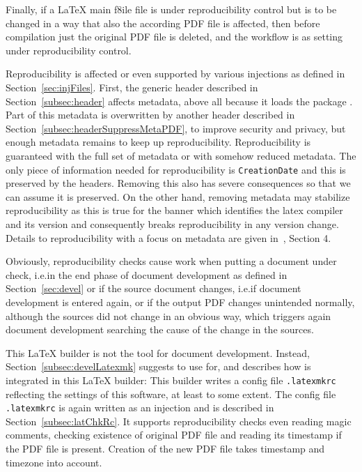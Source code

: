 Finally, if a \LaTeX{} main f8ile file is under reproducibility control 
but is to be changed in a way that also the according PDF file is affected, 
then before compilation just the original PDF file is deleted, 
and the workflow is as setting under reproducibility control. 
\medskip


Reproducibility is affected or even supported by various injections 
as defined in Section~\ref{sec:injFiles}. 
First, the generic header described in Section~\ref{subsec:header} 
affects metadata, above all because it loads the package . 
Part of this metadata is overwritten by another header 
described in Section~\ref{subsec:headerSuppressMetaPDF}, 
to improve security and privacy, 
but enough metadata remains to keep up reproducibility. 
Reproducibility is guaranteed with the full set of metadata 
or with somehow reduced metadata. 
The only piece of information needed for reproducibility is \texttt{CreationDate} 
and this is preserved by the headers. 
Removing this also has severe consequences 
so that we can assume it is preserved. 
On the other hand, removing metadata may stabilize reproducibility 
as this is true for the banner which identifies the latex compiler and its version 
and consequently breaks reproducibility in any version change. 
Details to reproducibility with a focus on metadata are given in~\cite{LatexGen}, Section 4. 

Obviously, reproducibility checks cause work 
when putting a document under check, 
i.e.\@ in the end phase of document development 
as defined in Section~\ref{sec:devel}
or if the source document changes, i.e.\@ if document development is entered again, 
or if the output PDF changes unintended 
normally, although the sources did not change in an obvious way, 
which triggers again document development searching the cause of the change in the sources. 

This \LaTeX{} builder is not the tool for document development. 
Instead, Section~\ref{subsec:develLatexmk} suggests to use  for, 
and describes how  is integrated in this \LaTeX{} builder: 
This builder writes a config file \texttt{.latexmkrc} 
reflecting the settings of this software, at least to some extent. 
The config file \texttt{.latexmkrc} is again written as an injection 
and is described in Section~\ref{subsec:latChkRc}. 
It supports reproducibility checks even reading magic comments, 
checking existence of original PDF file 
and reading its timestamp if the PDF file is present. 
Creation of the new PDF file takes timestamp and timezone into account. 

